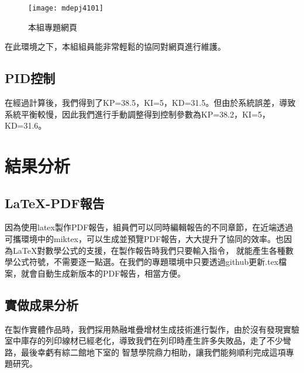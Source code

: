 \begin{figure}[h]
    \centering
    \texttt{[image: mdepj4101]}
    \caption{本組專題網頁}
\end{figure}

在此環境之下，本組組員能非常輕鬆的協同對網頁進行維護。\\




\subsection{PID控制}
在經過計算後，我們得到了KP=38.5，KI=5，KD=31.5。但由於系統誤差，導致系統平衡較慢，因此我們進行手動調整得到控制參數為KP=38.2，KI=5，KD=31.6。\\



\section{結果分析}

\subsection{LaTeX-PDF報告}
因為使用latex製作PDF報告，組員們可以同時編輯報告的不同章節，在近端透過可攜環境中的miktex，可以生成並預覽PDF報告，大大提升了協同的效率。也因為LaTeX對數學公式的支援，在製作報告時我們只要輸入指令，
就能產生各種數學公式符號，不需要逐一點選。在我們的專題環境中只要透過github更新.tex檔案，就會自動生成新版本的PDF報告，相當方便。\\

\subsection{實做成果分析}
在製作實體作品時，我們採用熱融堆疊增材生成技術進行製作，由於沒有發現實驗室中庫存的列印線材已經老化，導致我們在列印時產生許多失敗品，走了不少彎路，最後幸虧有綜二館地下室的
智慧學院鼎力相助，讓我們能夠順利完成這項專題研究。
